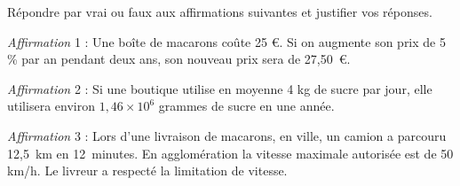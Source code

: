 
\medskip

Répondre par vrai ou faux aux affirmations suivantes et justifier vos réponses.

\medskip

\emph{Affirmation }1 : Une boîte de macarons coûte 25 \euro. Si on augmente son prix de 5\,\% par an
pendant deux ans, son nouveau prix sera de 27,50~\euro.

\medskip

\emph{Affirmation }2 : Si une boutique utilise en moyenne 4 kg de sucre par jour, elle utilisera environ
$1,46 \times 10^6$ grammes de sucre en une année.

\medskip

\emph{Affirmation }3 : Lors d'une livraison de macarons, en ville, un camion a parcouru 12,5~km en 12~minutes. En agglomération la vitesse maximale autorisée est de 50 km/h. Le livreur a respecté la
limitation de vitesse.

\bigskip

